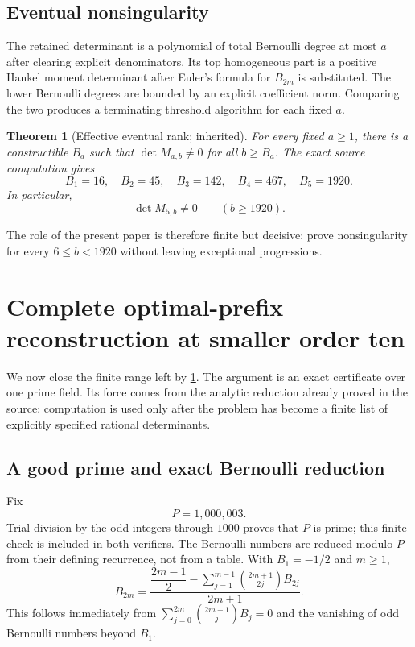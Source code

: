 \documentclass[11pt]{article}
\newtheorem{theorem}{Theorem}[section]
\theoremstyle{definition}
\begin{document}
\subsection{Eventual nonsingularity}

The retained determinant is a polynomial of total Bernoulli degree at
most $a$ after clearing explicit denominators.  Its top homogeneous
part is a positive Hankel moment determinant after Euler's formula for
$B_{2m}$ is substituted.  The lower Bernoulli degrees are bounded by an
explicit coefficient norm.  Comparing the two produces a terminating
threshold algorithm for each fixed $a$.

\begin{theorem}[Effective eventual rank; inherited]
\label{thm:eventual}
For every fixed $a\ge1$, there is a constructible $B_a$ such that
$\det M_{a,b}\ne0$ for all $b\ge B_a$.  The exact source computation
gives
\[
 B_1=16,
 \quad B_2=45,
 \quad B_3=142,
 \quad B_4=467,
 \quad B_5=1920.
\]
In particular,
\begin{equation}
 \det M_{5,b}\ne0\qquad(b\ge1920).
 \label{eq:eventual-order-ten}
\end{equation}
\end{theorem}

The role of the present paper is therefore finite but decisive: prove
nonsingularity for every $6\le b<1920$ without leaving exceptional
progressions.
 \section{Complete optimal-prefix reconstruction at smaller order ten}
\label{sec:order-ten}

We now close the finite range left by \cref{thm:eventual}.  The argument
is an exact certificate over one prime field.  Its force comes from the
analytic reduction already proved in the source: computation is used
only after the problem has become a finite list of explicitly specified
rational determinants.

\subsection{A good prime and exact Bernoulli reduction}

Fix
\begin{equation}
 P=1{,}000{,}003.
 \label{eq:certificate-prime}
\end{equation}
Trial division by the odd integers through $1000$ proves that $P$ is
prime; this finite check is included in both verifiers.  The Bernoulli
numbers are reduced modulo $P$ from their defining recurrence, not from
a table.  With $B_1=-1/2$ and $m\ge1$,
\begin{equation}
 B_{2m}=\frac{\dfrac{2m-1}{2}
       -\displaystyle\sum_{j=1}^{m-1}\binom{2m+1}{2j}B_{2j}}
       {2m+1}.
 \label{eq:even-bernoulli-recurrence}
\end{equation}
This follows immediately from
$\sum_{j=0}^{2m}\binom{2m+1}{j}B_j=0$ and the vanishing of odd
Bernoulli numbers beyond $B_1$.
\end{document}
